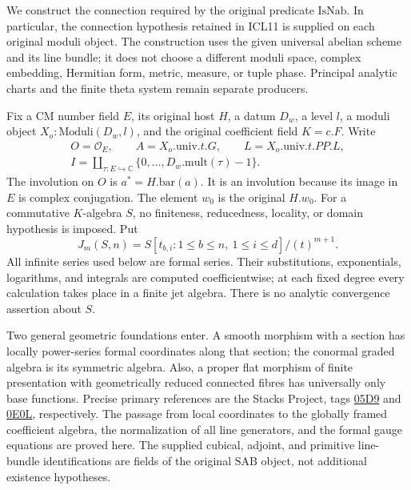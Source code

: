 \documentclass[11pt,a4paper]{article}
\numberwithin{equation}{section}
\theoremstyle{remark}\newtheorem{remark}[theorem]{Remark}
\begin{document}
We construct the connection required by the original predicate
\(\mathrm{IsNab}\).  In particular, the connection hypothesis retained in
ICL11 is supplied on each original moduli object.  The construction uses
the given universal abelian scheme and its line bundle; it does not
choose a different moduli space, complex embedding, Hermitian form,
metric, measure, or tuple phase.  Principal analytic charts and the
finite theta system remain separate producers.

Fix a CM number field \(E\), its original host \(H\), a datum
\(D_w\), a level \(l\), a moduli object \(X_o:\mathrm{Moduli}(D_w,l)\),
and the original coefficient field \(K=c.F\).  Write
\[
 \begin{gathered}
 O=\mathcal O_E,\qquad A=X_o.\mathrm{univ}.t.G,
 \qquad L=X_o.\mathrm{univ}.t.PP.L,\\
 I=\coprod_{\tau:E\hookrightarrow\mathbb C}
            \{0,\ldots,D_w.\mathrm{mult}(\tau)-1\}.
 \end{gathered}
                                                               \tag{CNC.1}
\]
The involution on \(O\) is \(a^*=H.\mathrm{bar}(a)\).  It is an
involution because its image in \(E\) is complex conjugation.  The
element \(w_0\) is the original \(H.w_0\).
For a commutative \(K\)-algebra \(S\), no finiteness, reducedness,
locality, or domain hypothesis is imposed.  Put
\[
 J_m(S,n)=S[t_{b,i}:1\leq b\leq n,\ 1\leq i\leq d]
                    /(t)^{m+1}.
\]
All infinite series used below are formal series.  Their substitutions,
exponentials, logarithms, and integrals are computed coefficientwise;
at each fixed degree every calculation takes place in a finite jet
algebra.  There is no analytic convergence assertion about \(S\).

Two general geometric foundations enter.  A smooth morphism with a
section has locally power-series formal coordinates along that section;
the conormal graded algebra is its symmetric algebra.  Also, a proper
flat morphism of finite presentation with geometrically reduced connected
fibres has universally only base functions.  Precise primary references
are the Stacks Project, tags
\href{https://stacks.math.columbia.edu/tag/05D9}{05D9} and
\href{https://stacks.math.columbia.edu/tag/0E0L}{0E0L}, respectively.
The passage from local coordinates to the globally framed coefficient
algebra, the normalization of all line generators, and the formal gauge
equations are proved here.  The supplied cubical, adjoint, and primitive
line-bundle identifications are fields of the original \(\mathrm{SAB}\)
object, not additional existence hypotheses.
\end{document}
